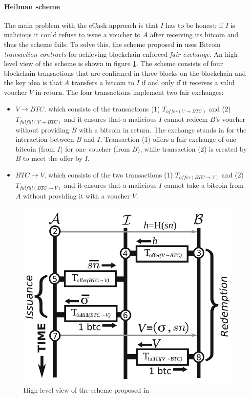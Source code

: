 \paragraph{Heilman scheme} The main problem with the eCash approach is that $I$
has to be honest: if $I$ is malicious it could refuse to issue a voucher to $A$
after receiving its bitcoin and thus the scheme fails. To solve this, the scheme
proposed in \cite{heilman-blindly-signed-contracts} uses Bitcoin
\emph{transaction contracts} for achieving blockchain-enforced \emph{fair
exchange}. An high level view of the scheme is shown in figure
\ref{fig:heilman-scheme}. The scheme consists of four blockchain transactions
that are confirmed in three blocks on the blockchain and the key idea is that
$A$ transfers a bitcoin to $I$ if and only if it receives a valid voucher $V$ in
return. The four transactions implement two fair exchanges:
\begin{itemize}
  \item $V\rightarrow BTC$, which consists of the transactions (1) $T_{offer(V\rightarrow
  BTC)}$ and (2) $T_{fulfill(V\rightarrow BTC)}$ and it ensures that a malicious $I$
  cannot redeem $B$’s voucher without providing $B$ with a bitcoin in return.
  The exchange stands in for the interaction between $B$ and $I$.
  Transaction (1) offers a fair exchange of one bitcoin (from $I$) for
  one voucher (from $B$), while transaction (2) is created by $B$ to meet
  the offer by $I$.
  \item $BTC\rightarrow V$, which consists of the two transactions (1) $T_{offer(BTC\rightarrow
  V)}$ and (2) $T_{fulfill(BTC\rightarrow V)}$ and it ensures that a malicious $I$
  cannot take a bitcoin from $A$ without providing it with a voucher $V$.
\end{itemize}


\begin{figure}[!htb]
	\centering
	\includegraphics[width=0.6\linewidth]{img/heilman-scheme.png}
	\caption{High-level view of the scheme proposed in \cite{heilman-blindly-signed-contracts}}
	\label{fig:heilman-scheme}
\end{figure}

